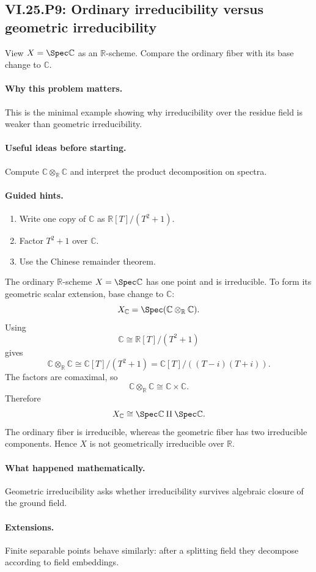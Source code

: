 \subsection*{VI.25.P9: Ordinary irreducibility versus geometric irreducibility}
\begin{problem}\label{prob:vi25-p09}
View \(X=\Spec\mathbb C\) as an \(\mathbb R\)-scheme. Compare the ordinary fiber with its base change to \(\mathbb C\).
\end{problem}

\ifdefined\FullProblemDossiers
\paragraph{Why this problem matters.}
This is the minimal example showing why irreducibility over the residue field is weaker than geometric irreducibility.

\paragraph{Useful ideas before starting.}
Compute \(\mathbb C\otimes_{\mathbb R}\mathbb C\) and interpret the product decomposition on spectra.

\paragraph{Guided hints.}
\begin{enumerate}
\item Write one copy of \(\mathbb C\) as \(\mathbb R[T]/(T^2+1)\).
\item Factor \(T^2+1\) over \(\mathbb C\).
\item Use the Chinese remainder theorem.
\end{enumerate}

\begin{solution}
The ordinary \(\mathbb R\)-scheme \(X=\Spec\mathbb C\) has one point and is irreducible.  To form its geometric scalar extension, base change to \(\mathbb C\):
\[
X_{\mathbb C}
=
\Spec(\mathbb C\otimes_{\mathbb R}\mathbb C).
\]
Using
\[
\mathbb C\cong\mathbb R[T]/(T^2+1)
\]
gives
\[
\mathbb C\otimes_{\mathbb R}\mathbb C
\cong
\mathbb C[T]/(T^2+1)
=
\mathbb C[T]/((T-i)(T+i)).
\]
The factors are comaximal, so
\[
\mathbb C\otimes_{\mathbb R}\mathbb C
\cong
\mathbb C\times\mathbb C.
\]
Therefore
\[
X_{\mathbb C}
\cong
\Spec\mathbb C\amalg\Spec\mathbb C.
\]
The ordinary fiber is irreducible, whereas the geometric fiber has two irreducible components.  Hence \(X\) is not geometrically irreducible over \(\mathbb R\).
\end{solution}

\paragraph{What happened mathematically.}
Geometric irreducibility asks whether irreducibility survives algebraic closure of the ground field.

\paragraph{Extensions.}
Finite separable points behave similarly: after a splitting field they decompose according to field embeddings.
\fi

